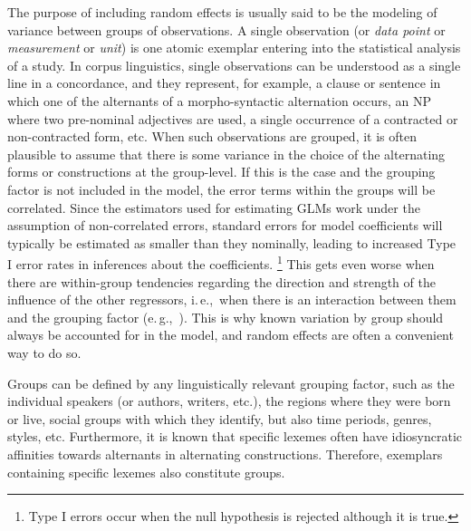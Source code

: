 \documentclass[a4paper,12pt]{article}
\newcommand{\ie}{i.\,e.,\ }
\newcommand{\eg}{e.\,g.,\ }
\begin{document}
The purpose of including random effects is usually said to be the modeling of variance between groups of observations.
A single observation (or \textit{data point} or \textit{measurement} or \textit{unit}) is one atomic exemplar entering into the statistical analysis of a study.
In corpus linguistics, single observations can be understood as a single line in a concordance, and they represent, for example, a clause or sentence in which one of the alternants of a morpho-syntactic alternation occurs, an NP where two pre-nominal adjectives are used, a single occurrence of a contracted or non-contracted form, etc.
When such observations are grouped, it is often plausible to assume that there is some variance in the choice of the alternating forms or constructions at the group-level.
If this is the case and the grouping factor is not included in the model, the error terms within the groups will be correlated.
Since the estimators used for estimating GLMs work under the assumption of non-correlated errors, standard errors for model coefficients will typically be estimated as smaller than they nominally, leading to increased Type I error rates in inferences about the coefficients.%
\footnote{Type I errors occur when the null hypothesis is rejected although it is true.}
This gets even worse when there are within-group tendencies regarding the direction and strength of the influence of the other regressors, \ie when there is an interaction between them and the grouping factor (\eg \citealt{SchielzethForstmeier2009}).
This is why known variation by group should always be accounted for in the model, and random effects are often a convenient way to do so.

Groups can be defined by any linguistically relevant grouping factor, such as the individual speakers (or authors, writers, etc.), the regions where they were born or live, social groups with which they identify, but also time periods, genres, styles, etc.
Furthermore, it is known that specific lexemes often have idiosyncratic affinities towards alternants in alternating constructions.
Therefore, exemplars containing specific lexemes also constitute groups.
\end{document}
